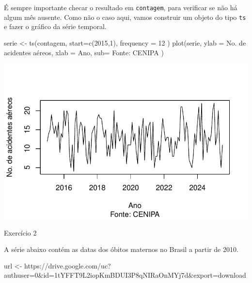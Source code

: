 \documentclass[
  letterpaper,
  DIV=11,
  numbers=noendperiod]{scrreprt}
\newenvironment{Shaded}{\begin{snugshade}}{\end{snugshade}}
\newcommand{\AttributeTok}[1]{\textcolor[rgb]{0.40,0.45,0.13}{#1}}
\newcommand{\DecValTok}[1]{\textcolor[rgb]{0.68,0.00,0.00}{#1}}
\newcommand{\FunctionTok}[1]{\textcolor[rgb]{0.28,0.35,0.67}{#1}}
\newcommand{\NormalTok}[1]{\textcolor[rgb]{0.00,0.23,0.31}{#1}}
\newcommand{\OtherTok}[1]{\textcolor[rgb]{0.00,0.23,0.31}{#1}}
\newcommand{\StringTok}[1]{\textcolor[rgb]{0.13,0.47,0.30}{#1}}
\begin{document}
É sempre importante checar o resultado em \texttt{contagem}, para
verificar se não há algum mês ausente. Como não o caso aqui, vamos
construir um objeto do tipo \texttt{ts} e fazer o gráfico da série
temporal.

\begin{Shaded}
\begin{Highlighting}[]
\NormalTok{serie }\OtherTok{\textless{}{-}} \FunctionTok{ts}\NormalTok{(contagem, }\AttributeTok{start=}\FunctionTok{c}\NormalTok{(}\DecValTok{2015}\NormalTok{,}\DecValTok{1}\NormalTok{), }\AttributeTok{frequency =} \DecValTok{12}\NormalTok{ )}
\FunctionTok{plot}\NormalTok{(serie, }\AttributeTok{ylab =} \StringTok{\textquotesingle{}No. de acidentes aéreos\textquotesingle{}}\NormalTok{, }\AttributeTok{xlab =} \StringTok{\textquotesingle{}Ano\textquotesingle{}}\NormalTok{, }\AttributeTok{sub=} \StringTok{\textquotesingle{}Fonte: CENIPA\textquotesingle{}}\NormalTok{ )}
\end{Highlighting}
\end{Shaded}

\includegraphics{intro_files/figure-pdf/unnamed-chunk-18-1.pdf}

Exercício 2

A série abaixo contém as datas dos óbitos maternos no Brasil a partir de
2010.

\begin{Shaded}
\begin{Highlighting}[]
\NormalTok{url }\OtherTok{\textless{}{-}} \StringTok{\textquotesingle{}https://drive.google.com/uc?authuser=0\&id=1tYFFT9L2iopKmBDUI3P8qNIRaOnMYj7d\&export=download\textquotesingle{}}
\end{Highlighting}
\end{Shaded}
\end{document}
